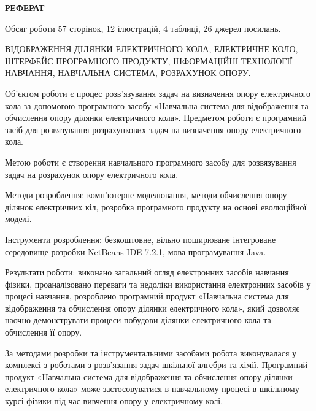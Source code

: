 \begin{center}
{\Large \textbf{РЕФЕРАТ}}
\end{center}

\vspace{1cm}

{\Large

Обсяг роботи 57 сторінок, 12 ілюстрацій, 4 таблиці, 26 джерел посилань.

\begin{sloppypar}
ВІДОБРАЖЕННЯ ДІЛЯНКИ ЕЛЕКТРИЧНОГО КОЛА, ЕЛЕКТРИЧНЕ КОЛО, ІНТЕРФЕЙС ПРОГРАМНОГО ПРОДУКТУ, ІНФОРМАЦІЙНІ ТЕХНОЛОГІЇ НАВЧАННЯ, НАВЧАЛЬНА СИСТЕМА, РОЗРАХУНОК ОПОРУ.
\end{sloppypar}

Об’єктом роботи є процес розв’язування задач на визначення опору електричного кола за допомогою програмного засобу «Навчальна система для відображення та обчислення опору ділянки електричного кола». Предметом
роботи є програмний засіб для розвязування розрахункових задач на визначення
опору електричного кола.

Метою роботи є створення навчального програмного засобу для
розвязування задач на розрахунок опору електричного кола.

Методи розроблення: комп’ютерне моделювання, методи обчислення опору
ділянок електричних кіл, розробка програмного продукту на основі еволюційної
моделі.

Інструменти розроблення: безкоштовне, вільно поширюване інтегроване
середовище розробки NetBeans IDE 7.2.1, мова програмування Java.

Результати роботи: виконано загальний огляд електронних засобів навчання
фізики, проаналізовано переваги та недоліки використання електронних засобів у
процесі навчання, розроблено програмний продукт «Навчальна система для
відображення та обчислення опору ділянки електричного кола», який дозволяє
наочно демонструвати процеси побудови ділянки електричного кола та
обчислення її опору.

За методами розробки та інструментальними засобами робота виконувалася
у комплексі з роботами з розв’язання задач шкільної алгебри та хімії.
Програмний продукт «Навчальна система для відображення та обчислення
опору ділянки електричного кола» може застосовуватися в навчальному процесі в
шкільному курсі фізики під час вивчення опору у електричному колі.

}

